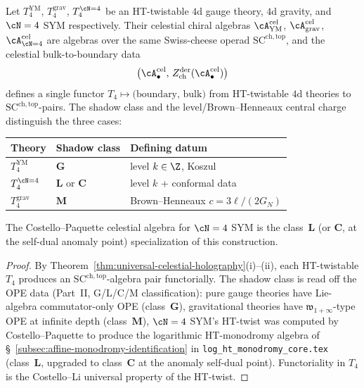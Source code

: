 \begin{theorem}[Unification: YM + gravity + $\cN=4$ share a single $\mathrm{SC}^{\mathrm{ch,top}}$ skeleton]
\label{thm:ym-gravity-N4-unification}
Let $T_4^{\mathrm{YM}}$, $T_4^{\mathrm{grav}}$, $T_4^{\cN=4}$ be an
HT-twistable $4$d gauge theory, $4$d gravity, and $\cN=4$ SYM
respectively. Their celestial chiral algebras
$\cA^{\mathrm{cel}}_{\mathrm{YM}}$, $\cA^{\mathrm{cel}}_{\mathrm{grav}}$,
$\cA^{\mathrm{cel}}_{\cN=4}$ are algebras over the same Swiss-cheese
operad $\mathrm{SC}^{\mathrm{ch,top}}$, and the celestial
bulk-to-boundary data
\[
\bigl(\cA^{\mathrm{cel}}_\bullet,\,
 Z^{\mathrm{der}}_{\mathrm{ch}}(\cA^{\mathrm{cel}}_\bullet)\bigr)
\]
defines a single functor
$T_4 \mapsto \bigl(\text{boundary, bulk}\bigr)$ from HT-twistable $4$d
theories to $\mathrm{SC}^{\mathrm{ch,top}}$-pairs. The shadow class
and the level/Brown--Henneaux central charge distinguish the three
cases:
\begin{center}
\begin{tabular}{l|l|l}
Theory & Shadow class & Defining datum \\\hline
$T_4^{\mathrm{YM}}$ & $\mathbf G$ & level $k\in\Z$, Koszul\\
$T_4^{\cN=4}$ & $\mathbf L$ or $\mathbf C$ & level $k$ + conformal data\\
$T_4^{\mathrm{grav}}$ & $\mathbf M$ & Brown--Henneaux $c=3\ell/(2G_N)$
\end{tabular}
\end{center}
The Costello--Paquette celestial algebra for $\cN=4$ SYM is the
class~$\mathbf L$ (or $\mathbf C$, at the self-dual anomaly point)
specialization of this construction.
\end{theorem}

\begin{proof}
By Theorem~\ref{thm:universal-celestial-holography}(i)--(ii), each
HT-twistable $T_4$ produces an
$\mathrm{SC}^{\mathrm{ch,top}}$-algebra pair functorially. The shadow
class is read off the OPE data (Part~II, G/L/C/M classification):
pure gauge theories have Lie-algebra commutator-only OPE
(class~$\mathbf G$), gravitational theories have
$\mathfrak{w}_{1+\infty}$-type OPE at infinite depth
(class~$\mathbf M$), $\cN=4$ SYM's HT-twist was computed by
Costello--Paquette to produce the logarithmic HT-monodromy algebra
of \S~\ref{subsec:affine-monodromy-identification} in
\texttt{log\_ht\_monodromy\_core.tex} (class~$\mathbf L$, upgraded to
class~$\mathbf C$ at the anomaly self-dual point).
Functoriality in $T_4$ is the Costello--Li universal property of
the HT-twist.
\end{proof}

